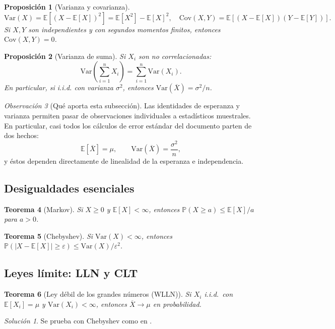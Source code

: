 \documentclass[11pt]{article}
\theoremstyle{plain}
\newtheorem{theorem}{Teorema}[section]
\newtheorem{proposition}[theorem]{Proposición}
\theoremstyle{definition}
\theoremstyle{remark}
\newtheorem{remark}[theorem]{Observación}
\theoremstyle{solstyle}
\newtheorem*{solution}{Solución}
\newcommand{\E}{\mathbb{E}}
\newcommand{\Var}{\mathrm{Var}}
\newcommand{\Cov}{\mathrm{Cov}}
\newcommand{\Pbb}{\mathbb{P}}
\newcommand{\1}{\mathbbm{1}}
\newcommand{\Xbar}{\overline{X}}
\begin{document}
\begin{proposition}[Varianza y covarianza]
\[
\Var(X)=\E[(X-\E[X])^2]=\E[X^2]-\E[X]^2,
\quad
\Cov(X,Y)=\E[(X-\E[X])(Y-\E[Y])].
\]
Si $X,Y$ son independientes y con segundos momentos finitos, entonces $\Cov(X,Y)=0$.
\end{proposition}

\begin{proposition}[Varianza de suma]
Si $X_i$ son no correlacionadas:
\[
\Var\!\left(\sum_{i=1}^n X_i\right)=\sum_{i=1}^n \Var(X_i).
\]
En particular, si i.i.d. con varianza $\sigma^2$, entonces $\Var(\Xbar)=\sigma^2/n$.
\end{proposition}


\begin{remark}[Qué aporta esta subsección]
Las identidades de esperanza y varianza permiten pasar de observaciones individuales a estadísticos muestrales.
En particular, casi todos los cálculos de error estándar del documento parten de dos hechos:
\[
\E[\Xbar]=\mu,
\qquad
\Var(\Xbar)=\frac{\sigma^2}{n},
\]
y éstos dependen directamente de linealidad de la esperanza e independencia.
\end{remark}

\subsection{Desigualdades esenciales}\label{app:prereq-ineq}

\begin{theorem}[Markov]
Si $X\ge 0$ y $\E[X]<\infty$, entonces $\Pbb(X\ge a)\le \E[X]/a$ para $a>0$.
\end{theorem}

\begin{theorem}[Chebyshev]
Si $\Var(X)<\infty$, entonces $\Pbb(|X-\E[X]|\ge \varepsilon)\le \Var(X)/\varepsilon^2$.
\end{theorem}

\subsection{Leyes límite: LLN y CLT}\label{app:prereq-limit}

\begin{theorem}[Ley débil de los grandes números (WLLN)]
Si $X_i$ i.i.d.\ con $\E[X_i]=\mu$ y $\Var(X_i)<\infty$, entonces $\Xbar\to \mu$ en probabilidad.
\end{theorem}

\begin{solution}
Se prueba con Chebyshev como en .
\end{solution}
\end{document}
